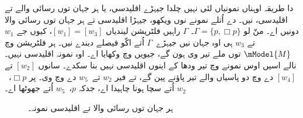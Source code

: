 \documentclass[../../../include/open-logic-section]{subfiles}
\begin{document}


 دا طریقہ اوہناں نمونیاں لئی نہیں چلدا جیہڑے اقلیدسی، یا ہر جہان توں رسائی والے تے اقلیدسی، نیں۔  دے اُتلے نمونے نوں ویکھو، جیہڑا اقلیدسی تے ہر جہان توں رسائی والا دونیں اے۔ منّ لو
$\Gamma = \{p, \Box p \}$۔ $\Gamma$ راہیں فلٹریشن لیندیاں
$[w_1] = [w_3]$، کیوں جے $w_1$ تے $w_3$ ہی اوہ جہان نیں جیہڑے~$\Gamma$ اُتے اکّو فیصلے دیندے نیں۔ ہر فلٹریشن وچ $\mModel{M}$ توں ملے تیر وی ہون گے، جیویں  وچ وکھایا اے۔ اوہ نمونہ اقلیدسی نہیں۔ نالے اسیں اوس نمونے وچ تیر ودھا کے اینوں اقلیدسی نہیں بنا سکدے۔ سانوں
$[w_2]$ تے $[w_4]$ دے وچ دو پاسیاں والے تیر پاؤنے پین گے، تے فیر $w_2$ تے~$w_5$ دے وچ وی۔ پر $\Box
p$،~$w_2$ اُتے سچا ہونا چاہیدا اے، جدکہ $p$،~$w_5$ اُتے جھوٹھا اے۔

\begin{figure}[htpb]
  \centering
  \caption{ہر جہان توں رسائی والا تے اقلیدسی نمونہ۔}
\end{figure}
\end{document}
